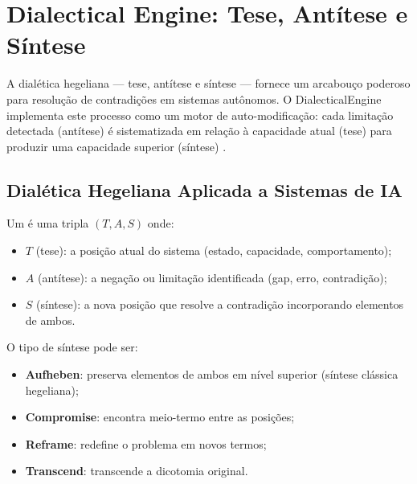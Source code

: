 \section{Dialectical Engine: Tese, Antítese e Síntese}
\label{sec:dialectical-engine}
\nivelphd

A dialética hegeliana — tese, antítese e síntese — fornece um
arcabouço poderoso para resolução de contradições em sistemas
autônomos. O DialecticalEngine implementa este processo como um motor
de auto-modificação: cada limitação detectada (antítese) é
sistematizada em relação à capacidade atual (tese) para produzir uma
capacidade superior (síntese) \cite{opencode2026spec036}.

\subsection{Dialética Hegeliana Aplicada a Sistemas de IA}

\begin{definicao}
Um  é uma tripla
$(T, A, S)$ onde:
\begin{itemize}
\item $T$ (tese): a posição atual do sistema (estado, capacidade,
comportamento);
\item $A$ (antítese): a negação ou limitação identificada (gap,
erro, contradição);
\item $S$ (síntese): a nova posição que resolve a contradição
incorporando elementos de ambos.
\end{itemize}
O tipo de síntese pode ser:
\begin{itemize}
\item \textbf{Aufheben}: preserva elementos de ambos em nível superior
(síntese clássica hegeliana);
\item \textbf{Compromise}: encontra meio-termo entre as posições;
\item \textbf{Reframe}: redefine o problema em novos termos;
\item \textbf{Transcend}: transcende a dicotomia original.
\end{itemize}
\end{definicao}

